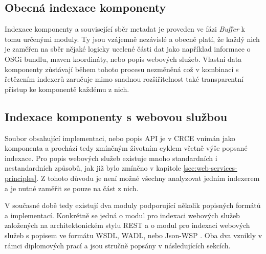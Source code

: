 \documentclass[czech,DP]{thesiskiv}
\begin{document}
\subsection{Obecná indexace komponenty}

Indexace komponenty a související sběr metadat je proveden ve fázi \textit{Buffer} k tomu určenými moduly. Ty jsou vzájemně nezávislé a obecně platí, že každý nich je zaměřen na sběr nějaké logicky ucelené části dat jako například informace o OSGi bundlu, maven koordináty, nebo popis webových služeb. Vlastní data komponenty zůstávají během tohoto procesu nezměněná což v kombinaci s řetězením indexerů zaručuje mimo snadnou rozšiřitelnost také transparentní přístup ke komponentě každému z nich. 

\subsection{Indexace komponenty s webovou službou}

Soubor obsahující implementaci, nebo popis API je v CRCE vnímán jako komponenta a prochází tedy zmíněným životním cyklem včetně výše popsané indexace. Pro popis webových služeb existuje mnoho standardních i nestandardních způsobů, jak již bylo zmíněno v kapitole \ref{sec:web-services-principles}. Z tohoto důvodu je není možné všechny analyzovat jedním indexerem a je nutné zaměřit se pouze na část z nich. 

V současné době tedy existují dva moduly podporující několik popisných formátů a implementací. Konkrétně se jedná o modul pro indexaci webových služeb založených na architektonickém stylu REST\cite{hessova2015rest} a o modul pro indexaci webových služeb s popisem ve formátu WSDL, WADL, nebo Json-WSP \cite{pejrimovsky2015ws}. Oba dva vznikly v rámci diplomových prací a jsou stručně popsány v následujících sekcích.

\end{document}
